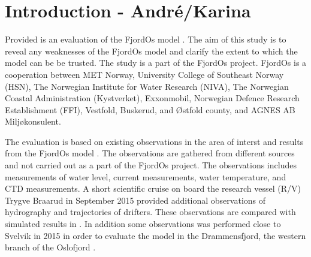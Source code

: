 
\section{Introduction - Andr\'{e}/Karina}
Provided is an evaluation of the FjordOs model \citep{roed:etal:2016}. The aim of this study is to reveal any weaknesses of the FjordOs model and clarify the extent to which the model can be be trusted. The study is a part of the FjordOs project. FjordOs is a cooperation between MET Norway, University College of Southeast Norway (HSN), The Norwegian Institute for Water Research (NIVA), The Norwegian Coastal Administration (Kystverket), Exxonmobil, Norwegian Defence Research Establishment (FFI), Vestfold, Buskerud, and \O stfold county, and AGNES AB Milj\o konsulent.

The evaluation is based on existing observations in the area of interst and results from the FjordOs model \citep{roed:etal:2016}. The observations are gathered from different sources and not carried out as a part of the FjordOs project. The observations includes measurements of water level, current measurements, water temperature, and CTD measurements. A short scientific cruise on board the research vessel (R/V) Trygve Braarud in September 2015 provided additional observations of hydrography and trajectories of drifters. These observations are compared with simulated results in \cite{hjelm:etal:2016}. In addition some observations was performed close to Svelvik in 2015 in order to evaluate the model in the Drammensfjord, the western branch of the Oslofjord \citep{staalstrom:2017}. 



\newpage
